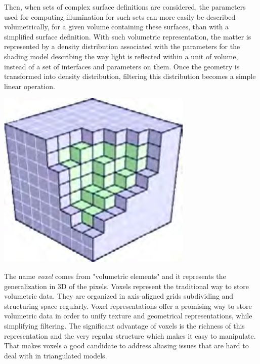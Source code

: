 Then, when sets of complex surface definitions are considered, the parameters used for computing illumination for such sets can more easily be described volumetrically, for a given volume containing these surfaces, than with a simplified surface definition. With such volumetric representation, the matter is represented by a density distribution associated with the parameters for the shading model describing the way light is reflected within a unit of volume, instead of a set of interfaces and parameters on them. Once the geometry is transformed into density distribution, filtering this distribution becomes a simple linear operation. 

\begin{marginfigure}
	\begin{center}
		\includegraphics[width=0.7\textwidth]{graphics/vct/vct-4-2}
	\end{center}
\end{marginfigure}

The name \textit{voxel} comes from "volumetric elements" and it represents the generalization in 3D of the pixels. Voxels represent the traditional way to store volumetric data. They are organized in axis-aligned grids subdividing and structuring space regularly. Voxel representations offer a promising way to store volumetric data in order to unify texture and geometrical representations, while simplifying filtering. The significant advantage of voxels is the richness of this representation and the very regular structure which makes it easy to manipulate. That makes voxels a good candidate to address aliasing issues that are hard to deal with in triangulated models.

